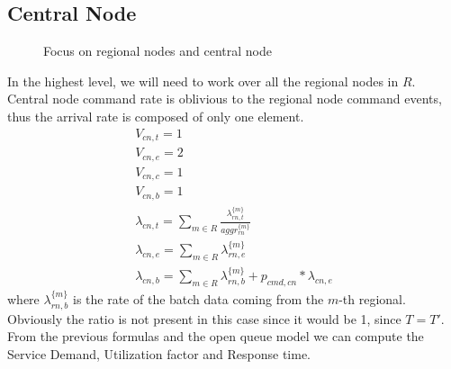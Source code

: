 \documentclass[11pt]{article}
\begin{document}
\subsection{Central Node}
\begin{figure}[H]
	\centering
	\hspace*{-3.7cm}
	\frame{}
	\caption{Focus on regional nodes and central node}
\end{figure}
In the highest level, we will need to work over all the regional nodes in $R$.\\
Central node command rate is oblivious to the regional node command events, thus the arrival rate is composed of only one element.
\begin{equation}
	\begin{array}{l}
		V_{cn, t} = 1 \\
		V_{cn, e} = 2 \\ %
		V_{cn, c} = 1 \\
		V_{cn, b} = 1 \\
        \lambda_{cn, t} = \sum\limits_{m \in R}{ \frac{\lambda^{\{m\}}_{rn, t}}{aggr^{\{ m \}}_{rn}}}  \\
        \lambda_{cn, e} = \sum\limits_{m \in R}{\lambda^{\{m\}}_{rn, e}} \\
        \lambda_{cn, b} = \sum\limits_{m \in R}{\lambda^{\{ m \}}_{rn, b}} + p_{cmd,cn} * \lambda_{cn, e}
	\end{array}
\end{equation}
where $\lambda^{\{ m \}}_{rn, b}$ is the rate of the batch data coming from the $m$-th regional.
Obviously the ratio is not present in this case since it would be 1, since $T = T'$.\\
From the previous formulas and the open queue model we can compute the Service Demand, Utilization factor and Response time.
\end{document}
